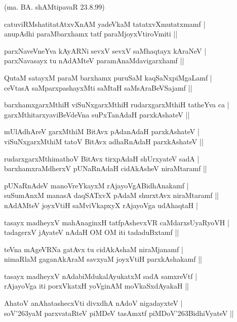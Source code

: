 \begin{itemize}
{\hfill{(ma. BA. shAMtipavaR 23.8.99)}
\item[36.] catuviRMshatitatAtxvXnAM yadeVkaM tatatxvXmutatxmamf |\\\label{150}
anupAdhi paraMbarxhamx tatf paraMjoyxVtiroVmiti ||
\item[37.] parxNaveVneYva kAyARNi sevxV sevxV saMhaqtayx kAraNeV |\\\label{150a}
parxNavasayx tu nAdAMteV paramAnaMdavigarxhamf ||
\item[38.] QutaM satayxM paraM barxhamx puruSaM kaqSaNxpiMgaLamf |\\\label{150b}
ceVtasA saMparxpashayxMti saMtaH saMsAraBeVSajamf ||
\item[39.] barxhamxgarxMthiH viSuNxgarxMthiH rudarxgarxMthiH tatheYva ca |\\\label{150c}
garxMthitarxyaviBeVdeVna suPxTanAdaH parxkAshateV ||
\item[40.] mUlAdhAreV garxMthiM BitAvx pAdanAdaH parxkAshateV |\\
viSuNxgarxMthiM tatoV BitAvx adhaRnAdaH parxkAshateV ||
\item[41.] rudarxgarxMthimathoV BitAvx tirxpAdaH shUrxyateV sadA |\\
barxhamxraMdherxV pUNaRnAdaH cidAkAsheV niraMtaramf ||
\item[42.] pUNaRnAdeV manoVreYkayxM rAjayoVgABidhAnakamf |\\
suSumAnxM manasA daqSATxvX pAdaM shurxtAvx niraMtaramf ||\\
nAdAMteV joyxVtiH saMviVkapxyX rAjayoVga udAhaqtaH |
\item[43.] tasayx madheyxV mahAnaginxH tatfpAshevxVR caMdarxsUyaRyoVH |\\\label{150d}
tadagerxV jAyateV nAdaH OM OM iti tadaduBxtamf ||
\item[44.] teVna mAgeVRNa gatAvx tu cidAkAshaM niraMjanamf |\\
nimaRlaM gaganAkAraM savxyaM joyxVtiH parxkAshakamf ||
\item[45.] tasayx madheyxV nAdabiMdukalAyukatxM sadA samxreVtf |\\
rAjayoVga iti porxVkatxH yoVginAM moVkaSxdAyakaH ||
\item[46.] AhatoV anAhatashecxVti divxdhA nAdoV nigadayxteV |\\\label{150e}
soV\char'263yaM parxvataRteV piMDeV tasAmxtf piMDoV\char'263BidhiVyateV ||

}
\end{itemize}
